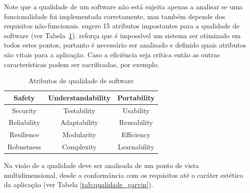 \documentclass[
	12pt,				%
	openright,			%
	twoside,			%
	a4paper,			%
	english,			%
	brazil,				%
	]{abntex2}
\begin{document}
Note que a qualidade de um software não está sujeita apenas a analisar se uma funcionalidade foi implementada corretamente, mas também depende dos requisitos não-funcionais.  sugere 15 atributos impostantes para a qualidade de software (ver Tabela~\ref{tab:atributos_qualidade}). %
 reforça que é impossível um sistema ser otimizado em todos estes pontos, portanto é necessário ser analisado e definido quais atributos são vitais para a aplicação. Caso a eficiência seja crítica então as outras características podem ser sacrificadas, por exemplo.

\begin{table}[h]
    \centering
    \caption{Atributos de qualidade de software}
    \label{tab:atributos_qualidade}
    \begin{tabular}{c|c|c}
        Safety & Understandability & Portability \\ \hline
        Security & Testability & Usability \\ \hline
        Reliability & Adaptability & Reusability \\ \hline
        Resilience & Modularity & Efficiency \\ \hline
        Robustness & Complexity & Learnability
    \end{tabular}
\end{table}


Na visão de  a qualidade deve ser analisada de um ponto de vista multidimensional, desde a conformância com os requisitos até o caráter estético da aplicação (ver Tabela \ref{tab:qualidade_garvin}). 
\end{document}
